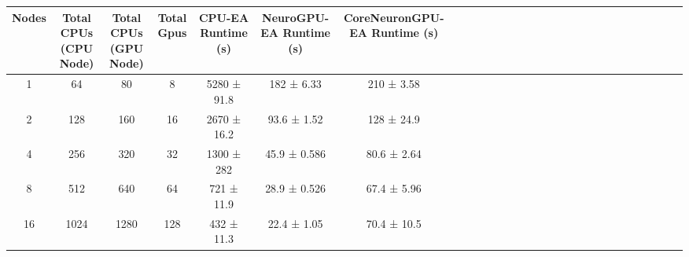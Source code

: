 \begin{tabular}{|c|c|c|c|c|c|c|c|c|c|c|c|c|c|c|c|c|c|c|c|c|c|c|c|c|c|c|c|}
\toprule
 Nodes &  Total CPUs (CPU Node) &  Total CPUs (GPU Node) &  Total Gpus & CPU-EA Runtime (s) & NeuroGPU-EA Runtime (s) & CoreNeuronGPU-EA Runtime (s) \\
\midrule
     1 &                     64 &                     80 &           8 &        5280 ± 91.8 &              182 ± 6.33 &                   210 ± 3.58 \\
     2 &                    128 &                    160 &          16 &        2670 ± 16.2 &             93.6 ± 1.52 &                   128 ± 24.9 \\
     4 &                    256 &                    320 &          32 &         1300 ± 282 &            45.9 ± 0.586 &                  80.6 ± 2.64 \\
     8 &                    512 &                    640 &          64 &         721 ± 11.9 &            28.9 ± 0.526 &                  67.4 ± 5.96 \\
    16 &                   1024 &                   1280 &         128 &         432 ± 11.3 &             22.4 ± 1.05 &                  70.4 ± 10.5 \\
\bottomrule
\end{tabular}
